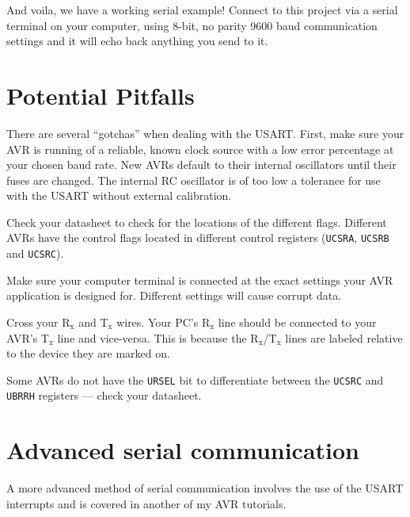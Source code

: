 \documentclass[a4paper,oneside,notitlepage]{book}
\newcommand{\subscript}[1]{\ensuremath{_{\textrm{#1}}}}
\begin{document}
And voila, we have a working serial example! Connect to this project via a serial terminal on your computer, using 8-bit, no parity 9600 baud communication settings and it will echo back anything you send to it.


\chapter{Potential Pitfalls}

There are several ``gotchas'' when dealing with the USART. First, make sure your AVR is running of a reliable, known clock source with a low error percentage at your chosen baud rate. New AVRs default to their internal oscillators until their fuses are changed. The internal RC oscillator is of too low a tolerance for use with the USART without external calibration.

Check your datasheet to check for the locations of the different flags. Different AVRs have the control flags located in different control registers (\texttt{UCSRA}, \texttt{UCSRB} and \texttt{UCSRC}).

Make sure your computer terminal is connected at the exact settings your AVR application is designed for. Different settings will cause corrupt data.

Cross your R\subscript{x} and T\subscript{x} wires. Your PC's R\subscript{x} line should be connected to your AVR's T\subscript{x} line and vice-versa. This is because the R\subscript{x}/T\subscript{x} lines are labeled relative to the device they are marked on.

Some AVRs do not have the \texttt{URSEL} bit to differentiate between the \texttt{UCSRC} and \texttt{UBRRH} registers --- check your datasheet.


\chapter{Advanced serial communication}

A more advanced method of serial communication involves the use of the USART interrupts and is covered in another of my AVR tutorials.
\end{document}
